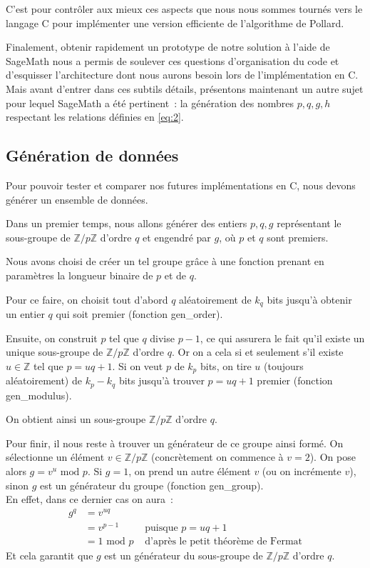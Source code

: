         C'est pour contrôler aux mieux ces aspects que nous nous sommes tournés vers le langage C pour implémenter une version efficiente de l'algorithme de Pollard.

        Finalement, obtenir rapidement un prototype de notre solution à l'aide de SageMath nous a permis de soulever ces questions d'organisation du code et d'esquisser l'architecture dont nous aurons besoin lors de l'implémentation en C.
        Mais avant d'entrer dans ces subtils détails, présentons maintenant un autre sujet pour lequel SageMath a été pertinent~: la génération des nombres $p, q, g, h$ respectant les relations définies en \eqref{eq:2}.

        \subsection{Génération de données}
        \label{chapter2:sagemath:data}
        Pour pouvoir tester et comparer nos futures implémentations en C, nous devons générer un ensemble de données.

        Dans un premier temps, nous allons générer des entiers $p, q, g$ représentant le sous-groupe de $\mathbb{Z}/p\mathbb{Z}$ d'ordre $q$ et engendré par $g$, où $p$ et $q$ sont premiers.

        Nous avons choisi de créer un tel groupe grâce à une fonction prenant en paramètres la longueur binaire de $p$ et de $q$.

        Pour ce faire, on choisit tout d'abord $q$ aléatoirement de $k_q$ bits jusqu'à obtenir un entier $q$ qui soit premier (fonction gen\_order).

        Ensuite, on construit $p$ tel que $q$ divise $p - 1$, ce qui assurera le fait qu'il existe un unique sous-groupe de $\mathbb{Z}/p\mathbb{Z}$ d'ordre $q$. Or on a cela si et seulement s'il existe $u \in\mathbb{Z}$ tel que $p = uq + 1$. Si on veut $p$ de $k_p$ bits, on tire $u$ (toujours aléatoirement) de $k_p - k_q$ bits jusqu'à trouver $p = uq + 1$ premier (fonction gen\_modulus).

        On obtient ainsi un sous-groupe $\mathbb{Z}/p\mathbb{Z}$ d'ordre $q$.

        Pour finir, il nous reste à trouver un générateur de ce groupe ainsi formé. On sélectionne un élément $v \in \mathbb{Z}/p\mathbb{Z}$ (concrètement on commence à $v = 2$). On pose alors $g = v^u \text{ mod } p$. Si $g = 1$, on prend un autre élément $v$ (ou on incrémente $v$), sinon $g$ est un générateur du groupe (fonction gen\_group).\\
        En effet, dans ce dernier cas on aura~:
        \begin{align*}
        g^q & = v^{uq} \\
            & = v^{p-1} & \text{ puisque } p = uq + 1 \\
            & = 1 \text{ mod } p & \text{ d'après le petit théorème de Fermat}
        \end{align*}
        Et cela garantit que $g$ est un générateur du sous-groupe de $\mathbb{Z}/p\mathbb{Z}$ d'ordre $q$.\\

